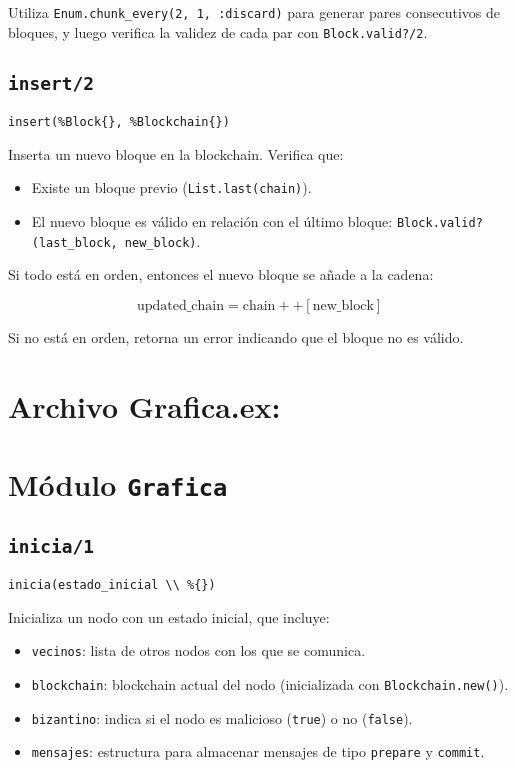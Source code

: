 {Utiliza \texttt{Enum.chunk\_every(2, 1, :discard)} para generar pares consecutivos de bloques, y luego verifica la validez de cada par con \texttt{Block.valid?/2}.

\subsection*{\texttt{insert/2}}
\begin{verbatim}
insert(%Block{}, %Blockchain{})
\end{verbatim}

Inserta un nuevo bloque en la blockchain. Verifica que:

\begin{itemize}
    \item Existe un bloque previo (\texttt{List.last(chain)}).
    \item El nuevo bloque es válido en relación con el último bloque: \texttt{Block.valid?(last\_block, new\_block)}.
\end{itemize}

Si todo está en orden, entonces el nuevo bloque se añade a la cadena:

\[
\text{updated\_chain} = \text{chain} ++ [\text{new\_block}]
\]

Si no está en orden, retorna un error indicando que el bloque no es válido.\\


\section*{Archivo \textbf{Grafica.ex}:}

\section*{Módulo \texttt{Grafica}}

\subsection*{\texttt{inicia/1}}
\begin{verbatim}
inicia(estado_inicial \\ %{})
\end{verbatim}

Inicializa un nodo con un estado inicial, que incluye:

\begin{itemize}
    \item \texttt{vecinos}: lista de otros nodos con los que se comunica.
    \item \texttt{blockchain}: blockchain actual del nodo (inicializada con \texttt{Blockchain.new()}).
    \item \texttt{bizantino}: indica si el nodo es malicioso (\texttt{true}) o no (\texttt{false}).
    \item \texttt{mensajes}: estructura para almacenar mensajes de tipo \texttt{prepare} y \texttt{commit}.
\end{itemize}

}
